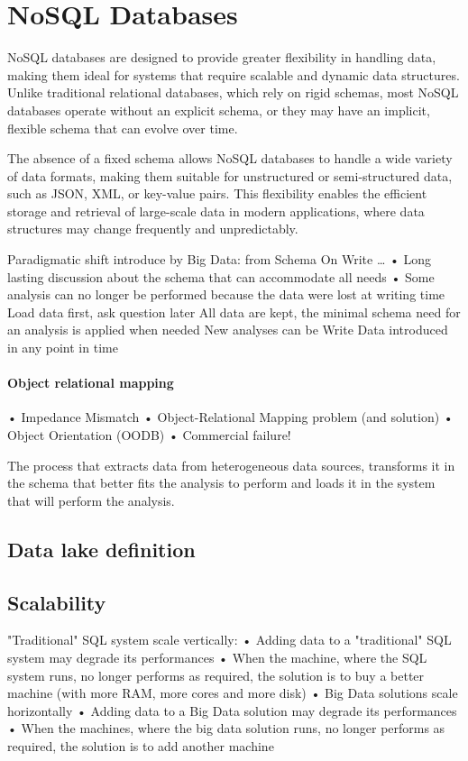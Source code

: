 \section{NoSQL Databases}

NoSQL databases are designed to provide greater flexibility in handling data, making them ideal for systems that require scalable and dynamic data structures. 
Unlike traditional relational databases, which rely on rigid schemas, most NoSQL databases operate without an explicit schema, or they may have an implicit, flexible schema that can evolve over time.

The absence of a fixed schema allows NoSQL databases to handle a wide variety of data formats, making them suitable for unstructured or semi-structured data, such as JSON, XML, or key-value pairs. 
This flexibility enables the efficient storage and retrieval of large-scale data in modern applications, where data structures may change frequently and unpredictably.

Paradigmatic shift introduce by Big Data: from
Schema On Write …
• Long lasting discussion
about the schema that
can accommodate all
needs
• Some analysis can no
longer be performed
because the data were
lost at writing time 
Load data first, ask
question later
All data are kept, the
minimal schema need for
an analysis is applied
when needed
New analyses can be
Write Data
introduced in any point in
time

\paragraph*{Object relational mapping}
• Impedance Mismatch
• Object-Relational Mapping problem
(and solution)
• Object Orientation (OODB)
• Commercial failure!


The process that extracts data
from heterogeneous data
sources, transforms it in the
schema that better fits the
analysis to perform and loads
it in the system that will
perform the analysis.

\subsection{Data lake definition}

\subsection{Scalability}
"Traditional" SQL system scale vertically:
• Adding data to a "traditional" SQL system may degrade its performances
• When the machine, where the SQL system runs, no longer performs as
required, the solution is to buy a better machine (with more RAM, more cores
and more disk)
• Big Data solutions scale horizontally
• Adding data to a Big Data solution may degrade its performances
• When the machines, where the big data solution runs, no longer performs as
required, the solution is to add another machine


